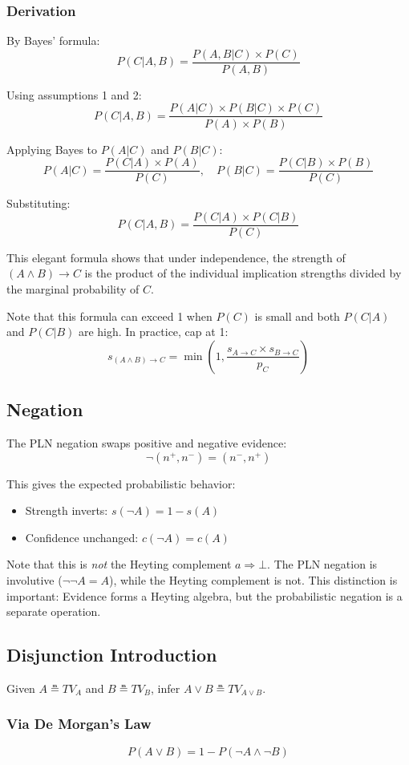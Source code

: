 \documentclass[]{article}
\begin{document}
\subsubsection{Derivation}
By Bayes' formula:
$$P(C|A,B) = \frac{P(A,B|C) \times P(C)}{P(A,B)}$$

Using assumptions 1 and 2:
$$P(C|A,B) = \frac{P(A|C) \times P(B|C) \times P(C)}{P(A) \times P(B)}$$

Applying Bayes to $P(A|C)$ and $P(B|C)$:
$$P(A|C) = \frac{P(C|A) \times P(A)}{P(C)}, \quad P(B|C) = \frac{P(C|B) \times P(B)}{P(C)}$$

Substituting:
$$P(C|A,B) = \frac{P(C|A) \times P(C|B)}{P(C)}$$

This elegant formula shows that under independence, the strength of
$(A \land B) \to C$ is the product of the individual implication
strengths divided by the marginal probability of $C$.

Note that this formula can exceed 1 when $P(C)$ is small and both
$P(C|A)$ and $P(C|B)$ are high.  In practice, cap at 1:
$$s_{(A\land B)\to C} = \min\left(1, \frac{s_{A\to C} \times s_{B\to C}}{p_C}\right)$$

\subsection{Negation}
\label{sec:negation}
The PLN negation swaps positive and negative evidence:
$$\neg(n^+, n^-) = (n^-, n^+)$$

This gives the expected probabilistic behavior:
\begin{itemize}
\item Strength inverts: $s(\neg A) = 1 - s(A)$
\item Confidence unchanged: $c(\neg A) = c(A)$
\end{itemize}

Note that this is \emph{not} the Heyting complement $a \Rightarrow \bot$.
The PLN negation is involutive ($\neg\neg A = A$), while the Heyting
complement is not.  This distinction is important: Evidence forms a
Heyting algebra, but the probabilistic negation is a separate operation.

\subsection{Disjunction Introduction}
\label{sec:disjunction}
Given $A \measeq TV_A$ and $B \measeq TV_B$, infer $A \lor B \measeq
TV_{A\lor B}$.

\subsubsection{Via De Morgan's Law}
$$P(A \lor B) = 1 - P(\neg A \land \neg B)$$
\end{document}
